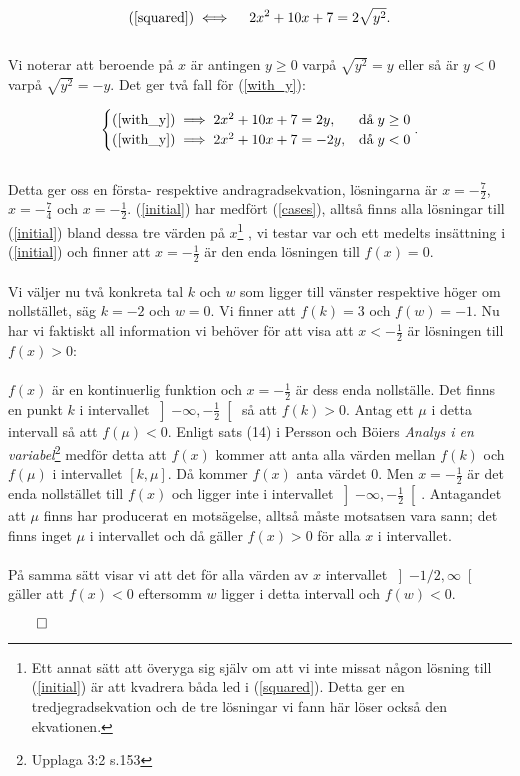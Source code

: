 \documentclass{article}
\begin{document}
\begin{gather}
  \text{(\ref{squared})} \iff \quad 2x^2 + 10x + 7 = 2\sqrt{y^2}\text{.} \label{with_y}
\end{gather}
\\
Vi noterar att beroende på $x$ är antingen $y \geq 0$ varpå $\sqrt{y^{2}} = y$ eller så är $y < 0$ varpå $\sqrt{y^{2}} = -y$. Det ger två fall för (\ref{with_y}):

\begin{align}
  \begin{cases}
    \text{(\ref{with_y})} \implies 2x^{2} + 10x + 7 = 2y, & \text{då}\; y \geq 0 \\
    \text{(\ref{with_y})} \implies 2x^{2} + 10x + 7 = -2y, & \text{då}\; y < 0
  \end{cases}\text{.} \label{cases}
\end{align}
\\
Detta ger oss en första- respektive andragradsekvation, lösningarna är $x = -\tfrac{7}{2}$, $x = -\tfrac{7}{4}$ och $x = -\tfrac{1}{2}$. (\ref{initial}) har medfört (\ref{cases}), alltså finns alla lösningar till (\ref{initial}) bland dessa tre värden på $x$\footnote{Ett annat sätt att överyga sig själv om att vi inte missat någon lösning till (\ref{initial}) är att kvadrera båda led i (\ref{squared}). Detta ger en tredjegradsekvation och de tre lösningar vi fann här löser också den ekvationen.}
, vi testar var och ett medelts insättning i (\ref{initial}) och finner att $x = -\frac{1}{2}$ är den enda lösningen till $f(x) = 0$.
\\
\\
Vi väljer nu två konkreta tal $k$ och $w$ som ligger till vänster respektive höger om nollstället, säg $k = -2$ och $w = 0$. Vi finner att $f(k) = 3$ och $f(w) = -1$. Nu har vi faktiskt all information vi behöver för att visa att $x < -\tfrac{1}{2}$ är lösningen till $f(x) > 0$:
\\
\\
$f(x)$ är en kontinuerlig funktion och $x = -\tfrac{1}{2}$ är dess enda nollställe. Det finns en punkt $k$ i intervallet $\left]-\infty, -\tfrac{1}{2}\right[$ så att $f(k) > 0$. Antag ett $\mu$ i detta intervall så att $f(\mu) < 0$. Enligt sats (14) i Persson och Böiers \emph{Analys i en variabel}\footnote{Upplaga 3:2 s.153} medför detta att $f(x)$ kommer att anta alla värden mellan $f(k)$ och $f(\mu)$ i intervallet $\left[k, \mu\right]$. Då kommer $f(x)$ anta värdet $0$. Men $x = -\tfrac{1}{2}$ är det enda nollstället till $f(x)$ och ligger inte i intervallet $\left]-\infty, -\tfrac{1}{2}\right[$. Antagandet att $\mu$ finns har producerat en motsägelse, alltså måste motsatsen vara sann; det finns inget $\mu$ i intervallet och då gäller $f(x) > 0$ för alla $x$ i intervallet.
\\
\\På samma sätt visar vi att det för alla värden av $x$ intervallet $ \left]-1/2, \infty\right[$ gäller att $f(x) < 0$ eftersomm $w$ ligger i detta intervall och $f(w) < 0$.

\centerline{$\qed$}
\end{document}
